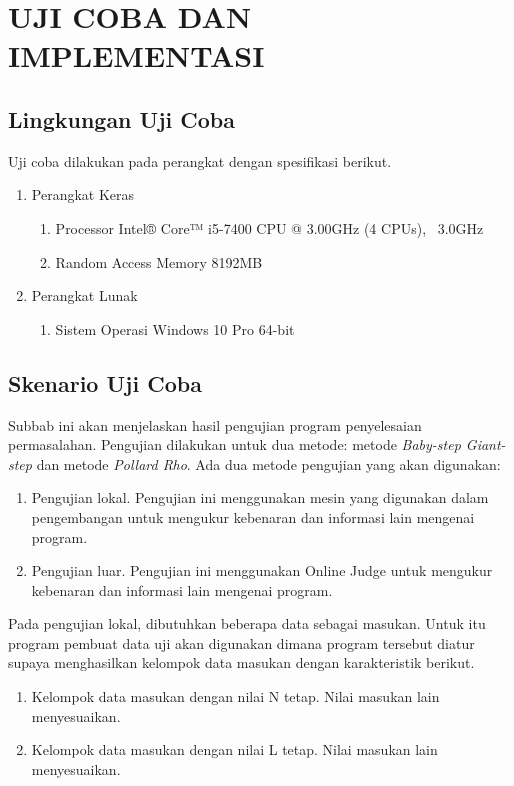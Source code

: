 \chapter{UJI COBA DAN IMPLEMENTASI}

\section{Lingkungan Uji Coba}

Uji coba dilakukan pada perangkat dengan spesifikasi berikut.
\begin{enumerate}
	\item Perangkat Keras
	\begin{enumerate}
		\item Processor Intel® Core™ i5-7400 CPU @ 3.00GHz (4 CPUs), ~3.0GHz
		\item Random Access Memory 8192MB
	\end{enumerate}
	\item Perangkat Lunak
	\begin{enumerate}
		\item Sistem Operasi Windows 10 Pro 64-bit
	\end{enumerate}
\end{enumerate}
\section{Skenario Uji Coba}

Subbab ini akan menjelaskan hasil pengujian program penyelesaian permasalahan. Pengujian dilakukan untuk dua metode: metode \textit{Baby-step Giant-step} dan metode \textit{Pollard Rho}. Ada dua metode pengujian yang akan digunakan:

\begin{enumerate}
\item Pengujian lokal. Pengujian ini menggunakan mesin yang digunakan dalam pengembangan untuk mengukur kebenaran dan informasi lain mengenai program.
\item Pengujian luar. Pengujian ini menggunakan Online Judge untuk mengukur kebenaran dan informasi lain mengenai program.
\end{enumerate}

Pada pengujian lokal, dibutuhkan beberapa data sebagai masukan. Untuk itu program pembuat data uji akan digunakan dimana program tersebut diatur supaya menghasilkan kelompok data masukan dengan karakteristik berikut.

\begin{enumerate}
\item Kelompok data masukan dengan nilai N tetap. Nilai masukan lain menyesuaikan.
\item Kelompok data masukan dengan nilai L tetap. Nilai masukan lain menyesuaikan.
\end{enumerate}

